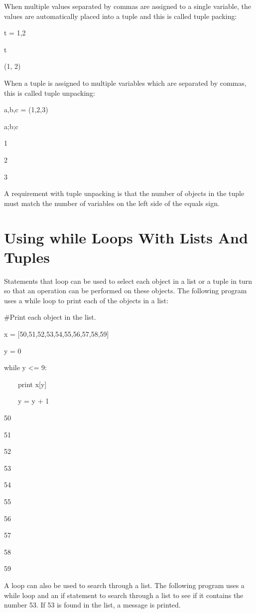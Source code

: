 \documentclass[12pt,oneside]{book}
\begin{document}
When multiple values separated by commas are assigned to a single variable, the values are automatically placed into a tuple and this is called tuple packing: 

t = 1,2

t

{\textbar}

(1, 2)

When a tuple is assigned to multiple variables which are separated by commas, this is called tuple unpacking: 

a,b,c = (1,2,3)

a;b;c

{\textbar}

1

2

3

A requirement with tuple unpacking is that the number of objects in the tuple must match the number of variables on the left side of the equals sign.

\section[Using while Loops With Lists And Tuples]{Using while Loops With Lists And Tuples}

Statements that loop can be used to select each object in a list or a tuple in turn so that an operation can be performed on these objects. The following program uses a while loop to print each of the objects in a list: 

\#Print each object in the list.

x = [50,51,52,53,54,55,56,57,58,59]

y = 0

while y {\textless}= 9:

\ \ \ \ print x[y]

\ \ \ \ y = y + 1

{\textbar}

50

51

52

53

54

55

56

57

58

59


A loop can also be used to search through a list. The following program uses a while loop and an if statement to search through a list to see if it contains the number 53. If 53 is found in the list, a message is printed. 
\end{document}
